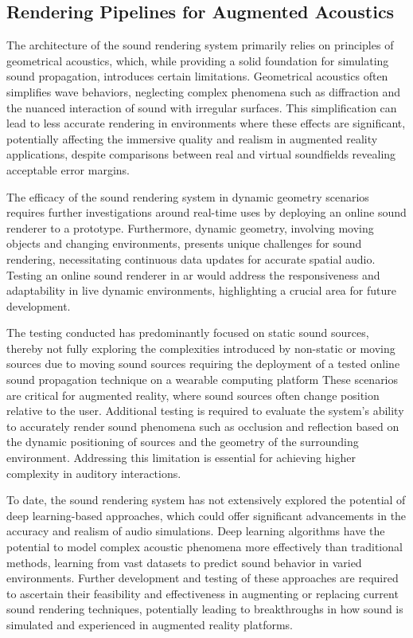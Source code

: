 \subsection{Rendering Pipelines for Augmented Acoustics}
The architecture of the sound rendering system primarily relies on principles of geometrical acoustics, which, while providing a solid foundation for simulating sound propagation, introduces certain limitations. Geometrical acoustics often simplifies wave behaviors, neglecting complex phenomena such as diffraction and the nuanced interaction of sound with irregular surfaces. This simplification can lead to less accurate rendering in environments where these effects are significant, potentially affecting the immersive quality and realism in augmented reality applications, despite comparisons between real and virtual soundfields revealing acceptable error margins.\par
The efficacy of the sound rendering system in dynamic geometry scenarios requires further investigations around real-time uses by deploying an online sound renderer to a prototype. Furthermore, dynamic geometry, involving moving objects and changing environments, presents unique challenges for sound rendering, necessitating continuous data updates for accurate spatial audio. Testing an online sound renderer in \acrshort{ar} would address the responsiveness and adaptability in live dynamic environments, highlighting a crucial area for future development.\par
The testing conducted has predominantly focused on static sound sources, thereby not fully exploring the complexities introduced by non-static or moving sources due to moving sound sources requiring the deployment of a tested online sound propagation technique on a wearable computing platform These scenarios are critical for augmented reality, where sound sources often change position relative to the user. Additional testing is required to evaluate the system's ability to accurately render sound phenomena such as occlusion and reflection based on the dynamic positioning of sources and the geometry of the surrounding environment. Addressing this limitation is essential for achieving higher complexity in auditory interactions.\par
To date, the sound rendering system has not extensively explored the potential of deep learning-based approaches, which could offer significant advancements in the accuracy and realism of audio simulations. Deep learning algorithms have the potential to model complex acoustic phenomena more effectively than traditional methods, learning from vast datasets to predict sound behavior in varied environments. Further development and testing of these approaches are required to ascertain their feasibility and effectiveness in augmenting or replacing current sound rendering techniques, potentially leading to breakthroughs in how sound is simulated and experienced in augmented reality platforms.\par

